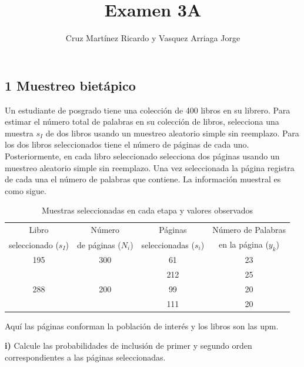 \documentclass[
]{article}
\title{Examen 3A}
\author{Cruz Martínez Ricardo y Vasquez Arriaga Jorge}
\date{}
\begin{document}
\maketitle

\hypertarget{muestreo-bietuxe1pico}{%
\subsection{1 Muestreo bietápico}\label{muestreo-bietuxe1pico}}

Un estudiante de posgrado tiene una colección de 400 libros en su
librero. Para estimar el número total de palabras en su colección de
libros, selecciona una muestra \(s_I\) de dos libros usando un muestreo
aleatorio simple sin reemplazo. Para los dos libros seleccionados tiene
el número de páginas de cada uno. Posteriormente, en cada libro
seleccionado selecciona dos páginas usando un muestreo aleatorio simple
sin reemplazo. Una vez seleccionada la página registra de cada una el
número de palabras que contiene. La información muestral es como sigue.

\begin{table}[H]
  \centering
  \caption{Muestras seleccionadas en cada etapa y valores observados}
    \begin{tabular}{cccc}\\
    Libro  & Número &Páginas & Número de Palabras   \\
    seleccionado ($s_I$) &de páginas ($N_i$)  & seleccionadas ($s_i$) & en la página ($y_k$) \\ \hline
    195   & 300   & 61    &  23    \\
         &       & 212   &  25    \vspace{.2cm}\\
    288   & 200   & 99    & 20    \\
          &       & 111   & 20   \\ \hline
   \end{tabular}
\end{table}

Aquí las páginas conforman la población de interés y los libros son las
upm.

\textbf{i)} Calcule las probabilidades de inclusión de primer y segundo
orden correspondientes a las páginas seleccionadas.
\end{document}
